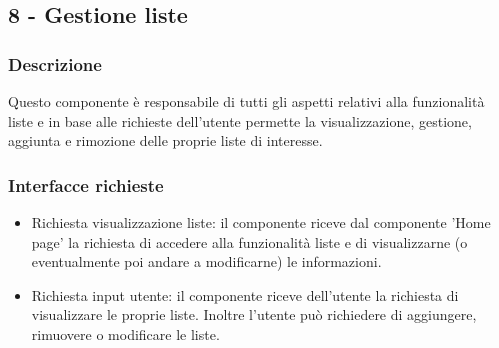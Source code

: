 \documentclass[a4paper,12pt]{article}
\begin{document}
\subsection*{8 -  Gestione liste}
\subsubsection*{Descrizione}
Questo componente è responsabile di tutti gli aspetti relativi alla funzionalità liste e in base alle richieste dell'utente permette la visualizzazione, gestione, aggiunta e rimozione delle proprie liste di interesse.
\subsubsection*{Interfacce richieste}
\begin{itemize} \setlength\itemsep{0.01em}.
\item {\sffamily Richiesta visualizzazione liste}: il componente riceve dal componente 'Home page'  la richiesta di accedere alla funzionalità liste e di visualizzarne (o eventualmente poi andare a modificarne) le informazioni.
\item {\sffamily Richiesta input utente}: il componente riceve dell'utente la richiesta di visualizzare le proprie liste. Inoltre l'utente può richiedere di aggiungere, rimuovere o modificare le liste.

\end{itemize}
\end{document}
